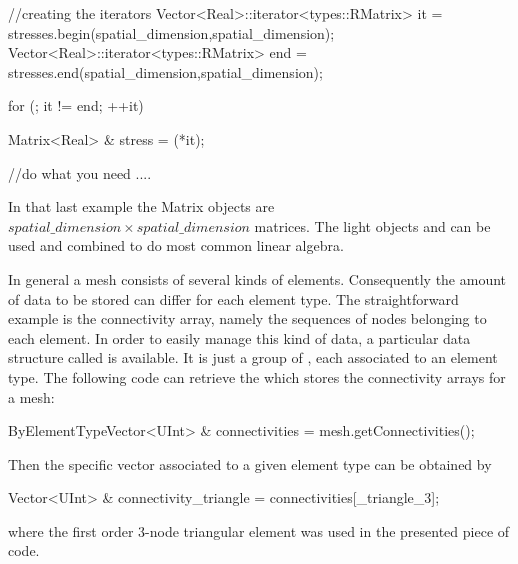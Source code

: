 \begin{cpp}
  //creating the iterators
  Vector<Real>::iterator<types::RMatrix> it  = stresses.begin(spatial_dimension,spatial_dimension);
  Vector<Real>::iterator<types::RMatrix> end = stresses.end(spatial_dimension,spatial_dimension);

  for (; it != end; ++it){
    Matrix<Real> & stress = (*it);

    //do what you need
    ....

  }
\end{cpp}
In that last example the Matrix objects are
$spatial\_dimension \times spatial\_dimension$ matrices.
The light objects  and  can be used and combined
to do most common linear algebra.

In general a mesh consists of several kinds of elements. Consequently the
amount of data to be stored can differ for each element type. The straightforward
example is the connectivity array, namely the sequences of nodes belonging to
each element. In order to easily manage this kind of data, a
particular data structure called  is available.
It is just a group of , each associated to an element
type. The following code can retrieve the 
which stores the connectivity arrays for a mesh:
\begin{cpp}
  ByElementTypeVector<UInt> & connectivities = mesh.getConnectivities();
\end{cpp}
Then the specific vector associated to a given element type can be
obtained by
\begin{cpp}
  Vector<UInt> & connectivity_triangle = connectivities[_triangle_3];
\end{cpp}
where the first order 3-node triangular element was used in the presented
piece of code.
